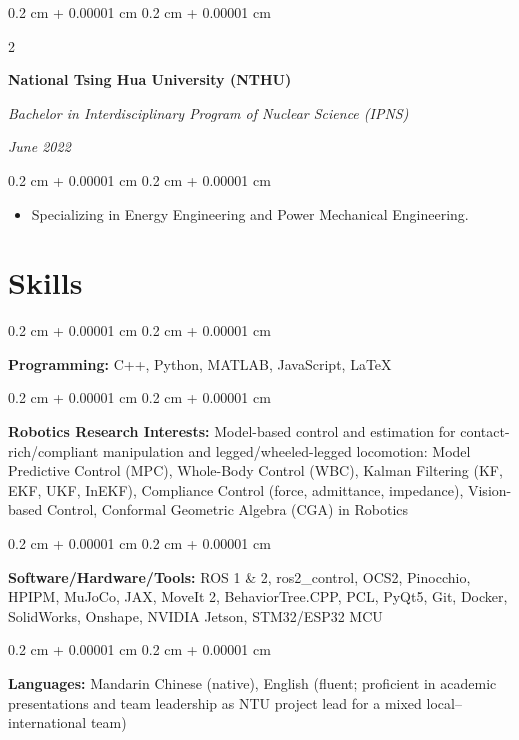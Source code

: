 \documentclass[10pt, letterpaper]{article}
\newenvironment{highlights}{
    \begin{itemize}[
        topsep=0.10 cm,
        parsep=0.10 cm,
        partopsep=0pt,
        itemsep=0pt,
        leftmargin=0.4 cm + 10pt
    ]
}{
    \end{itemize}
} %
\newenvironment{onecolentry}{
    \begin{adjustwidth}{
        0.2 cm + 0.00001 cm
    }{
        0.2 cm + 0.00001 cm
    }
}{
    \end{adjustwidth}
} %
\newenvironment{twocolentry}[2][4.5 cm]{
    \needspace{4\baselineskip}%
    \onecolentry
    \def\secondColumn{#2}
    \setcolumnwidth{\fill, #1}
    \begin{paracol}{2}
}{
    \switchcolumn \raggedleft \secondColumn
    \end{paracol}
    \endonecolentry
} %
\begin{document}
        \vspace{0.2 cm}

        \begin{twocolentry}{
            
        \textit{June 2022}}
            \textbf{National Tsing Hua University (NTHU)}
            
            \textit{Bachelor in Interdisciplinary Program of Nuclear Science (IPNS)}
        \end{twocolentry}
        \vspace{0.10 cm}
        \begin{onecolentry}
            \begin{highlights}
                \item Specializing in Energy Engineering and Power Mechanical Engineering.
            \end{highlights}
        \end{onecolentry}

    \section{Skills}

        \begin{onecolentry}
            \textbf{Programming:} C++, Python, MATLAB, JavaScript, LaTeX
        \end{onecolentry}
        \vspace{0.2 cm}
        \begin{onecolentry}
            \textbf{Robotics Research Interests:} Model-based control and estimation for contact-rich/compliant manipulation and legged/wheeled-legged locomotion: Model Predictive Control (MPC), Whole-Body Control (WBC), Kalman Filtering (KF, EKF, UKF, InEKF), Compliance Control (force, admittance, impedance), Vision-based Control, Conformal Geometric Algebra (CGA) in Robotics
        \end{onecolentry}
        \vspace{0.2 cm}
        \begin{onecolentry}
            \textbf{Software/Hardware/Tools:} ROS 1 \& 2, ros2\_control, OCS2, Pinocchio, HPIPM, MuJoCo, JAX, MoveIt 2, BehaviorTree.CPP, PCL, PyQt5, Git, Docker, SolidWorks, Onshape, NVIDIA Jetson, STM32/ESP32 MCU
        \end{onecolentry}

        \vspace{0.2 cm}
        \begin{onecolentry}
            \textbf{Languages:} Mandarin Chinese (native), English (fluent; proficient in academic presentations and team leadership as NTU project lead for a mixed local–international team)
        \end{onecolentry}
\end{document}
